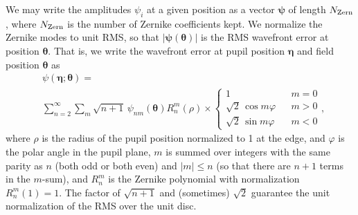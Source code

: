 \documentclass[aps,prd, amsmath,amssymb,superscriptaddress,showkeys,nofootinbib,reprint,preprintnumbers]{revtex4-1}
\begin{document}
We may write the amplitudes $\psi_i$ at a given position as a vector
${\boldsymbol\psi}$ of length $N_{\rm Zern}$, where $N_{\rm Zern}$ is
the number of Zernike coefficients kept. We normalize the Zernike
modes to unit RMS, so that $|{\boldsymbol\psi}({\boldsymbol\theta})|$
is the RMS wavefront error at position ${\boldsymbol\theta}$. That is,
we write the wavefront error at pupil position ${\boldsymbol\eta}$ and
field position ${\boldsymbol\theta}$ as
\begin{align}
&\psi({\boldsymbol\eta};{\boldsymbol\theta}) = \nonumber\\
&\sum_{n=2}^\infty
\sum_{m} \sqrt{n+1}\,\psi_{nm}({\boldsymbol\theta}) R_n^m(\rho)
\times\left\{\begin{array}{ccc} 1 & & m=0 \\ \sqrt2\,\cos m\varphi & &
m>0 \\ \sqrt2\,\sin m\varphi & & m<0 \end{array} \right.,
\end{align}
where $\rho$ is the radius of the pupil position normalized to 1 at
the edge, and $\varphi$ is the polar angle in the pupil plane, $m$ is
summed over integers with the same parity as $n$ (both odd or both
even) and $|m|\le n$ (so that there are $n+1$ terms in the $m$-sum),
and $R_n^m$ is the Zernike polynomial with normalization
$R_n^m(1)=1$. The factor of $\sqrt{n+1}$ and (sometimes) $\sqrt2$
guarantee the unit normalization of the RMS over the unit disc.
\end{document}
